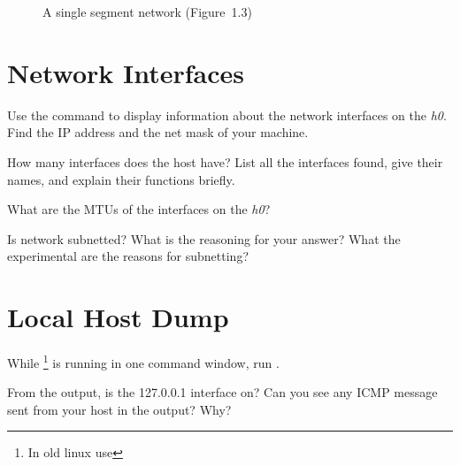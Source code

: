 \documentclass{../UTNetLab}
\begin{document}
\begin{center}
\begin{minipage}{0.48\textwidth}
\begin{flushright}
\begin{figure}[H]
                \caption{A single segment network (Figure~1.3)}\label{fig:1.3}
            \end{figure}
        \end{flushright}
    \end{minipage}
\end{center}

\section{Network Interfaces}
Use the  command to display information about the network interfaces on the \textit{h0}.
Find the IP address and the net mask of your machine.

\begin{report}
    \item How many interfaces does the host have?
    List all the interfaces found, give their names, and explain their functions briefly.

    \item What are the MTUs of the interfaces on the \textit{h0}?

    \item Is network subnetted?
    What is the reasoning for your answer? What the experimental are the reasons for subnetting?
\end{report}


\section{Local Host Dump}
While \footnote{In old linux use } is running in one command window, run .

\begin{report}
    \item From the  output, is the 127.0.0.1 interface on?
    Can you see any ICMP message sent from your host in the  output?
    Why?
\end{report}
\end{document}

